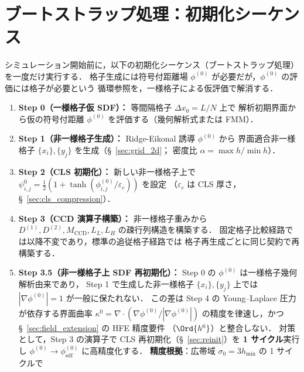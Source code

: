 
\section{ブートストラップ処理：初期化シーケンス}
\label{app:bootstrap}

シミュレーション開始前に，以下の初期化シーケンス（ブートストラップ処理）を一度だけ実行する．
格子生成には符号付距離場 $\phi^{(0)}$ が必要だが，$\phi^{(0)}$ の評価には格子が必要という
循環参照を，一様格子による仮評価で解消する．

\begin{tcolorbox}[algbox, title={ブートストラップ処理：初期化シーケンス（6 段階）}]
\begin{enumerate}
  \item \textbf{Step 0（一様格子仮 SDF）：} 等間隔格子 $\Delta x_0 = L/N$ 上で
        解析初期界面から仮の符号付距離 $\phi^{(0)}$ を評価する（幾何解析式または FMM）．
  \item \textbf{Step 1（非一様格子生成）：} Ridge-Eikonal 誘導 $\phi^{(0)}$ から
        界面適合非一様格子 $\{x_i\}, \{y_j\}$ を生成（§~\ref{sec:grid_2d}；
        密度比 $\alpha = \max h / \min h$）．
  \item \textbf{Step 2（CLS 初期化）：} 新しい非一様格子上で
        $\psi^0_{i,j} = \tfrac{1}{2}(1+\tanh(\phi^{(0)}_{i,j}/\varepsilon_c))$ を設定
        （$\varepsilon_c$ は CLS 厚さ，§~\ref{sec:cls_compression}）．
  \item \textbf{Step 3（CCD 演算子構築）：} 非一様格子重みから
        $D^{(1)}, D^{(2)}, M_{\mathrm{CCD}}, L_L, L_H$ の疎行列構造を構築する．
        固定格子比較経路では以降不変であり，標準の追従格子経路では
        格子再生成ごとに同じ契約で再構築する．
  \item \textbf{Step 3.5（非一様格子上 SDF 再初期化）：}
        Step 0 の $\phi^{(0)}$ は一様格子幾何解析由来であり，
        Step 1 で生成した非一様格子 $\{x_i\},\{y_j\}$ 上では
        $|\nabla\phi^{(0)}|=1$ が一般に保たれない．
        この差は Step 4 の Young--Laplace 圧力が依存する界面曲率
        $\kappa^0=\nabla\!\cdot\!(\nabla\phi^{(0)}/|\nabla\phi^{(0)}|)$
        の精度を律速し，かつ §~\ref{sec:field_extension} の HFE 精度要件
        （$\Ord{h^6}$）と整合しない．
        対策として，Step 3 の演算子で CLS 再初期化（§~\ref{sec:reinit}）を
        \textbf{1 サイクル}実行し
        $\phi^{(0)}\to\phi^{(0)}_\text{sdf}$ に高精度化する．
        \textbf{精度根拠}：広帯域 $\sigma_0 = 3 h_{\min}$ の 1 サイクルで

\end{enumerate}
\end{tcolorbox}
